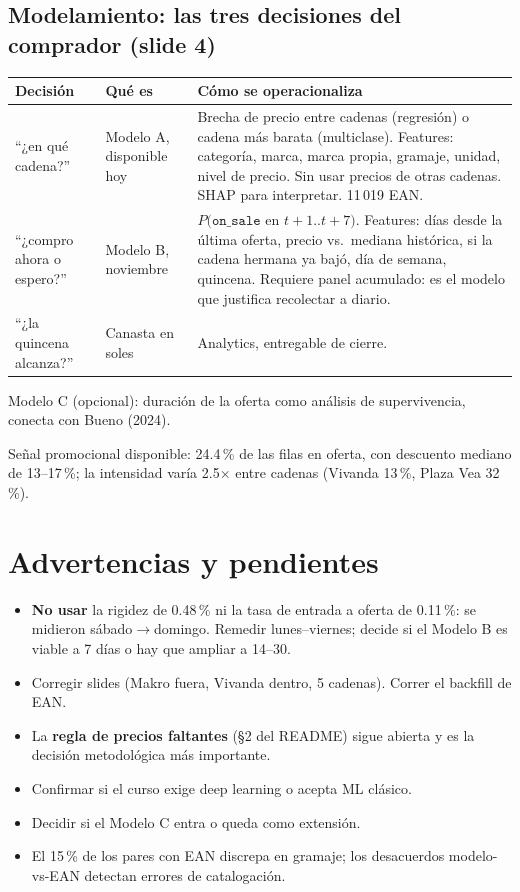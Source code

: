 \documentclass[11pt,a4paper]{article}
\begin{document}
\subsection*{Modelamiento: las tres decisiones del comprador (slide 4)}
\begin{table}[h]
\centering
\begin{tabular}{p{4cm}p{3cm}p{7.5cm}}
\toprule
\textbf{Decisión} & \textbf{Qué es} & \textbf{Cómo se operacionaliza} \\
\midrule
``¿en qué cadena?'' & Modelo A, disponible hoy & Brecha de precio entre cadenas (regresión) o cadena más barata (multiclase). Features: categoría, marca, marca propia, gramaje, unidad, nivel de precio. Sin usar precios de otras cadenas. SHAP para interpretar. 11\,019 EAN. \\
``¿compro ahora o espero?'' & Modelo B, noviembre & $P(\texttt{on\_sale}$ en $t{+}1..t{+}7)$. Features: días desde la última oferta, precio vs.\ mediana histórica, si la cadena hermana ya bajó, día de semana, quincena. Requiere panel acumulado: es el modelo que justifica recolectar a diario. \\
``¿la quincena alcanza?'' & Canasta en soles & Analytics, entregable de cierre. \\
\bottomrule
\end{tabular}
\end{table}

Modelo C (opcional): duración de la oferta como análisis de supervivencia,
conecta con Bueno (2024).

Señal promocional disponible: 24.4\,\% de las filas en oferta, con descuento
mediano de 13--17\,\%; la intensidad varía 2.5$\times$ entre cadenas (Vivanda
13\,\%, Plaza Vea 32\,\%).

\section{Advertencias y pendientes}

\begin{itemize}[nosep]
  \item \textbf{No usar} la rigidez de 0.48\,\% ni la tasa de entrada a oferta de
        0.11\,\%: se midieron sábado$\to$domingo. Remedir lunes--viernes; decide
        si el Modelo B es viable a 7 días o hay que ampliar a 14--30.
  \item Corregir slides (Makro fuera, Vivanda dentro, 5 cadenas). Correr el
        backfill de EAN.
  \item La \textbf{regla de precios faltantes} (\S 2 del README) sigue abierta y es
        la decisión metodológica más importante.
  \item Confirmar si el curso exige deep learning o acepta ML clásico.
  \item Decidir si el Modelo C entra o queda como extensión.
  \item El 15\,\% de los pares con EAN discrepa en gramaje; los desacuerdos
        modelo-vs-EAN detectan errores de catalogación.
\end{itemize}
\end{document}
